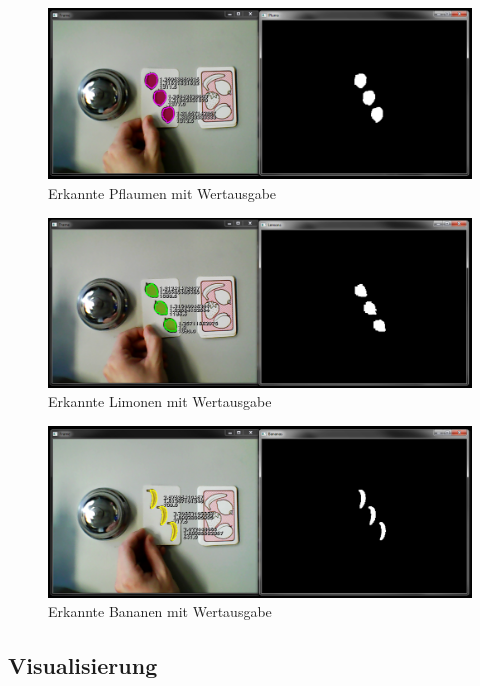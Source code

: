 \begin{figure}[H]
    \centering
    \includegraphics[width=\textwidth]{Abbildungen/Pflaumen03}
    \caption[ ]{Erkannte Pflaumen mit Wertausgabe}
    \label{fig:Pflaumen03}
\end{figure}
\begin{figure}[H]
    \centering
    \includegraphics[width=\textwidth]{Abbildungen/Limetten03}
    \caption[ ]{Erkannte Limonen mit Wertausgabe}
    \label{fig:Limetten03}
\end{figure}
\begin{figure}[H]
    \centering
    \includegraphics[width=\textwidth]{Abbildungen/Bananen03}
    \caption[ ]{Erkannte Bananen mit Wertausgabe}
    \label{fig:Bananen03}
\end{figure}

\subsection{Visualisierung}

